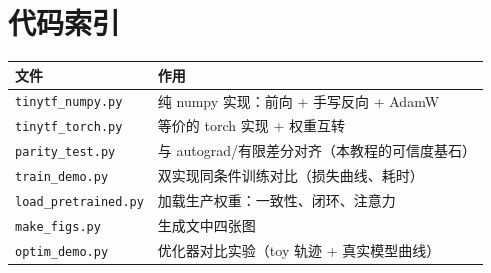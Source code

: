 \documentclass[11pt,a4paper]{ctexart}
\begin{document}
\section*{代码索引}
\begin{center}
\small
\begin{tabular}{@{}ll@{}}
\toprule
文件 & 作用 \\
\midrule
\texttt{tinytf\_numpy.py} & 纯 numpy 实现：前向 + 手写反向 + AdamW \\
\texttt{tinytf\_torch.py} & 等价的 torch 实现 + 权重互转 \\
\texttt{parity\_test.py} & 与 autograd/有限差分对齐（本教程的可信度基石）\\
\texttt{train\_demo.py} & 双实现同条件训练对比（损失曲线、耗时）\\
\texttt{load\_pretrained.py} & 加载生产权重：一致性、闭环、注意力 \\
\texttt{make\_figs.py} & 生成文中四张图 \\
\texttt{optim\_demo.py} & 优化器对比实验（toy 轨迹 + 真实模型曲线）\\
\bottomrule
\end{tabular}
\end{center}
\end{document}
